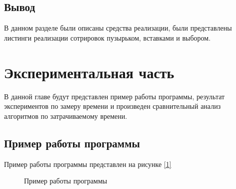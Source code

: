 \documentclass{article}
\begin{document}
	\subsection{Вывод}
	В данном разделе были описаны средства реализации, были представлены листинги реализации сотрировок пузырьком, вставками и выбором.

	\newpage
	\section{Экспериментальная часть}
	В данной главе будут представлен пример работы программы, результат экспериментов по замеру времени и произведен сравнительный анализ алгоритмов по затрачиваемому времени.
	\subsection{Пример работы программы}
	Пример работы программы представлен на рисунке \hyperref[programmWork]{[\ref{programmWork}]}
	 	\begin{figure}[h!]
		 	\caption{Пример работы программы}
		 	\label{programmWork}
	 	\end{figure}
	
\end{document}
